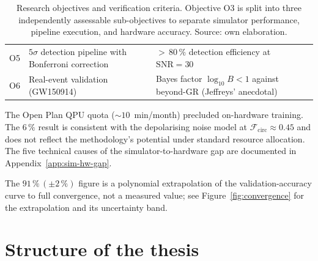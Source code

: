 \documentclass[11pt,a4paper, english]{book}
\theoremstyle{plain}
\theoremstyle{definition}
\numberwithin{equation}{chapter}
\numberwithin{figure}{chapter}
\numberwithin{table}{chapter}
\begin{document}
\begin{table}[ht]
\begin{threeparttable}
\begin{tabular}{@{}p{1.5cm}p{4.6cm}p{4.6cm}@{}}
O5   & $5\sigma$ detection pipeline with Bonferroni correction
     & ${>}\,80\,\%$ detection efficiency at $\mathrm{SNR}=30$ \\[4pt]
O6   & Real-event validation (GW150914)
     & Bayes factor $\log_{10}B < 1$ against beyond-GR
       (Jeffreys' anecdotal) \\ \bottomrule
\end{tabular}
\caption[Research objectives and verification criteria.]%
        {Research objectives and verification criteria.
         Objective O3 is split into three independently assessable
         sub-objectives to separate simulator performance, pipeline
         execution, and hardware accuracy. Source: own elaboration.}
\label{tab:objectives}

\begin{tablenotes}
  \footnotesize
  \item[a] The Open Plan QPU quota (${\sim}10$~min/month) precluded
    on-hardware training.
    The $6\,\%$ result is consistent with the depolarising noise model
    at $\mathcal{F}_{\mathrm{circ}}\approx 0.45$ and does not reflect
    the methodology's potential under standard resource allocation.
    The five technical causes of the simulator-to-hardware gap are
    documented in Appendix~\ref{app:sim-hw-gap}.
  \item[b] The $91\,\%\,(\pm2\,\%)$ figure is a polynomial extrapolation
    of the validation-accuracy curve to full convergence, not a
    measured value; see Figure~\ref{fig:convergence} for the
    extrapolation and its uncertainty band.
  \item[]
\end{tablenotes}
\end{threeparttable}
\end{table}
\section{Structure of the thesis}
\label{sec:structure}
\end{document}
